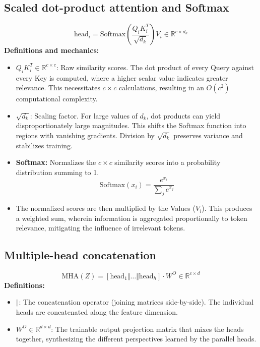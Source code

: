 \documentclass[11pt]{article}
\begin{document}
	\subsection{Scaled dot-product attention and Softmax}
	\begin{equation}
		\text{head}_i = \text{Softmax}\left(\frac{Q_i K_i^T}{\sqrt{d_k}}\right) V_i \in \mathbb{R}^{c \times d_k}
	\end{equation}
	\textbf{Definitions and mechanics:}
	\begin{itemize}
		\item $Q_i K_i^T \in \mathbb{R}^{c \times c}$: Raw similarity scores.
		The dot product of every Query against every Key is computed, where a higher scalar value indicates greater relevance.
		This necessitates $c \times c$ calculations, resulting in an $O(c^2)$ computational complexity.
		\item $\sqrt{d_k}$: Scaling factor.
		For large values of $d_k$, dot products can yield disproportionately large magnitudes.
		This shifts the Softmax function into regions with vanishing gradients.
		Division by $\sqrt{d_k}$ preserves variance and stabilizes training.
		\item \textbf{Softmax:} Normalizes the $c \times c$ similarity scores into a probability distribution summing to 1.
		\begin{equation}
			\text{Softmax}(x_i) = \frac{e^{x_i}}{\sum_{j} e^{x_j}}
		\end{equation}
		\item The normalized scores are then multiplied by the Values ($V_i$).
		This produces a weighted sum, wherein information is aggregated proportionally to token relevance, mitigating the influence of irrelevant tokens.
	\end{itemize}
	
	\subsection{Multiple-head concatenation}
	\begin{equation}
		\text{MHA}(Z) = [\text{head}_1 \Vert \dots \Vert \text{head}_h] \cdot W^O \in \mathbb{R}^{c \times d}
	\end{equation}
	\textbf{Definitions:}
	\begin{itemize}
		\item $\Vert$: The concatenation operator (joining matrices side-by-side).
		The individual heads are concatenated along the feature dimension.
		\item $W^O \in \mathbb{R}^{d \times d}$: The trainable output projection matrix that mixes the heads together, synthesizing the different perspectives learned by the parallel heads.
	\end{itemize}
	
\end{document}
